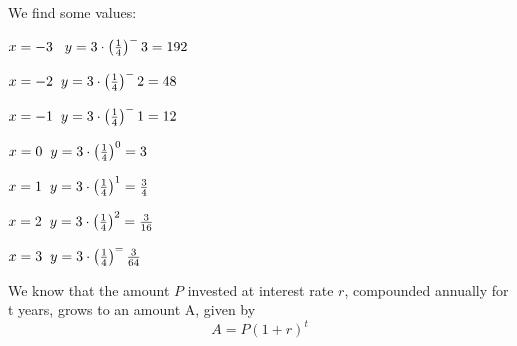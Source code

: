 \documentclass{report}
\begin{document}
\bigbreak \noindent \bigbreak \noindent
{}
\bigbreak\noindent\bigbreak\noindent
\begin{figure}[ht]
    \centering
  \end{figure}
  \begin{minipage}{0.4\textwidth}
  We find some values:	
  \vspace{2mm}

  $x=-3\hspace{3mm} y=3\cdot \left(\frac{1}{4}\right)^-3 = 192$
  \vspace{2mm}

  $x=-2 \hspace{2mm}y=3\cdot \left(\frac{1}{4}\right)^-2 = 48$
  \vspace{2mm}

  $x=-1\hspace{2mm}y=3\cdot \left(\frac{1}{4}\right)^-1 = 12$
  \vspace{2mm}

  $x=0\hspace{2mm}y=3\cdot \left(\frac{1}{4}\right)^0 = 3$
  \vspace{2mm}

  $x=1\hspace{2mm}y=3\cdot \left(\frac{1}{4}\right)^1 = \frac{3}{4}$
  \vspace{2mm}

  $x=2\hspace{2mm}y=3\cdot \left(\frac{1}{4}\right)^2=\frac{3}{16}$
  \vspace{2mm}

  $x=3\hspace{2mm}y=3\cdot \left(\frac{1}{4}\right)^ = \frac{3}{64}$
  \end{minipage}
\begin{minipage}{0.5\textwidth}
\end{minipage}
\pagebreak
{}
\bigbreak\noindent
\sol
\bigbreak
\noindent We know that the amount $P$ invested at interest rate $r$, compounded annually for t years, grows to an amount A, given by
$$ A = P(1+r)^t$$
\end{document}
